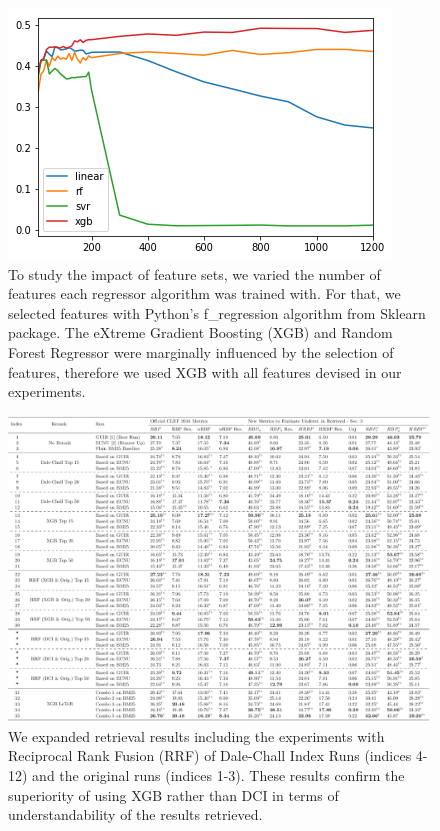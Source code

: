 \documentclass[10pt,a4paper]{article}
\begin{document}
\begin{figure}[h!]
	\centering
	\includegraphics[width=.6\textwidth]{appendix/features}
    \caption{To study the impact of feature sets, we varied the number of features each regressor algorithm was trained with. For that, we selected features with Python's f\_regression algorithm from Sklearn package. The eXtreme Gradient Boosting (XGB) and Random Forest Regressor were marginally influenced by the selection of features, therefore we used XGB with all features devised in our experiments.}
	\label{fig:dist}
\end{figure}

\begin{figure}[h!]
	\centering
	\includegraphics[width=1.0\textwidth]{appendix/tab_dci}
    \caption{We expanded retrieval results including the experiments with Reciprocal Rank Fusion (RRF) of Dale-Chall Index Runs (indices 4-12) and the original runs (indices 1-3). These results confirm the superiority of using XGB rather than DCI in terms of understandability of the results retrieved.}    
	\label{fig:dist}
\end{figure}
\end{document}
